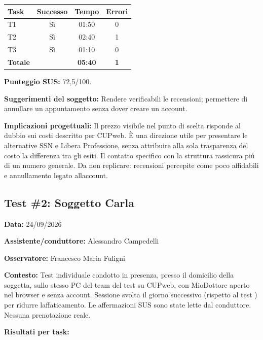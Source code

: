 \begin{center}
\begin{minipage}{\linewidth}
\centering
{}\label{tab:a-8}
\noindent\begin{tabular}{lccc}
\toprule
\textbf{Task} & \textbf{Successo} & \textbf{Tempo} & \textbf{Errori} \\
\midrule
T1 & Sì & 01:50 & 0 \\
T2 & Sì & 02:40 & 1 \\
T3 & Sì & 01:10 & 0 \\
\midrule
\textbf{Totale} & & \textbf{05:40} & \textbf{1} \\
\bottomrule
\end{tabular}
\end{minipage}
\end{center}

\textbf{Punteggio SUS:} 72,5/100.

\textbf{Suggerimenti del soggetto:} Rendere verificabili le
recensioni; permettere di annullare un appuntamento senza dover
creare un account.

\textbf{Implicazioni progettuali:} Il prezzo visibile nel punto di scelta
risponde al dubbio sui costi descritto per CUPweb. È una direzione utile per
presentare le alternative SSN e Libera Professione, senza
attribuire alla sola trasparenza del costo la differenza tra gli esiti. Il contatto specifico con la struttura
rassicura più di un numero generale. Da non replicare: recensioni
percepite come poco affidabili e annullamento legato all\textquotesingle account.

\subsection{Test \#2: Soggetto Carla}

\textbf{Data:} 24/09/2026

\textbf{Assistente/conduttore:} Alessandro Campedelli

\textbf{Osservatore:} Francesco Maria Fuligni

\textbf{Contesto:} Test individuale condotto in presenza, presso il
domicilio della soggetta, sullo stesso PC del team del test su
CUPweb, con MioDottore aperto nel browser e senza account. Sessione
svolta il giorno successivo (rispetto al test ) per ridurre
l\textquotesingle affaticamento. Le affermazioni SUS sono state lette
dal conduttore. Nessuna prenotazione reale.

\textbf{Risultati per task:}

